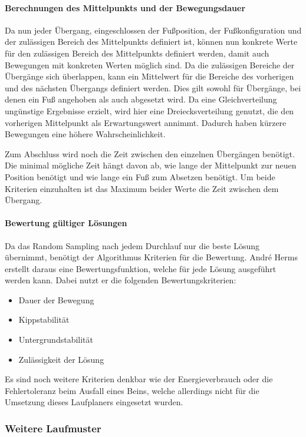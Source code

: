\paragraph{Berechnungen des Mittelpunkts und der Bewegungsdauer}

Da nun jeder Übergang, eingeschlossen der Fußposition, der Fußkonfiguration und der zulässigen Bereich des Mittelpunkts definiert ist, können nun konkrete Werte für den zulässigen Bereich des Mittelpunkts definiert werden, damit auch Bewegungen mit konkreten Werten möglich sind. Da die zulässigen Bereiche der Übergänge sich überlappen, kann ein Mittelwert für die Bereiche des vorherigen und des nächsten Übergangs definiert werden. Dies gilt sowohl für Übergänge, bei denen ein Fuß angehoben als auch abgesetzt wird. Da eine Gleichverteilung ungünstige Ergebnisse erzielt, wird hier eine Dreiecksverteilung genutzt, die den vorherigen Mittelpunkt als Erwartungswert annimmt. Dadurch haben kürzere Bewegungen eine höhere Wahrscheinlichkeit.  

Zum Abschluss wird noch die Zeit zwischen den einzelnen Übergängen benötigt. Die minimal mögliche Zeit hängt davon ab, wie lange der Mittelpunkt zur neuen Position benötigt und wie lange ein Fuß zum Absetzen benötigt. Um beide Kriterien einzuhalten ist das Maximum beider Werte die Zeit zwischen dem Übergang.

\paragraph{Bewertung gültiger Lösungen}

Da das Random Sampling nach jedem Durchlauf nur die beste Lösung übernimmt, benötigt der Algorithmus Kriterien für die Bewertung. André Herms erstellt daraus eine Bewertungsfunktion, welche für jede Lösung ausgeführt werden kann. Dabei nutzt er die folgenden Bewertungskriterien:
\begin{itemize}
  \item Dauer der Bewegung
  \item Kippstabilität
  \item Untergrundstabilität
  \item Zulässigkeit der Lösung
\end{itemize}

Es sind noch weitere Kriterien denkbar wie der Energieverbrauch oder die Fehlertoleranz beim Ausfall eines Beins, welche allerdings nicht für die Umsetzung dieses Laufplaners eingesetzt wurden.

\subsubsection{Weitere Laufmuster}

